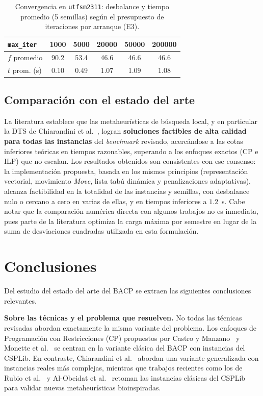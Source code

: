 \documentclass[letter, 10pt]{article}
\begin{document}
\begin{table}[h]
\centering
\begin{tabular}{lccccc}
\hline
\texttt{max\_iter} & 1000 & 5000 & 20000 & 50000 & 200000 \\
\hline
$f$ promedio  & 90.2 & 53.4 & 46.6 & 46.6 & 46.6 \\
$t$ prom. (s) & 0.10 & 0.49 & 1.07 & 1.09 & 1.08 \\
\hline
\end{tabular}
\caption{Convergencia en \texttt{utfsm2311}: desbalance y tiempo promedio (5 semillas) seg\'un el presupuesto de iteraciones por arranque (E3).}
\label{tab:e3}
\end{table}

\subsection{Comparaci\'on con el estado del arte}
La literatura establece que las metaheur\'isticas de b\'usqueda local, y en particular la DTS de Chiarandini et al.~\cite{Chiarandini2012}, logran \textbf{soluciones factibles de alta calidad para todas las instancias} del \emph{benchmark} revisado, acerc\'andose a las cotas inferiores te\'oricas en tiempos razonables, superando a los enfoques exactos (CP e ILP) que no escalan. Los resultados obtenidos son consistentes con ese consenso: la implementaci\'on propuesta, basada en los mismos principios (representaci\'on vectorial, movimiento \textit{Move}, lista tab\'u din\'amica y penalizaciones adaptativas), alcanza factibilidad en la totalidad de las instancias y semillas, con desbalance nulo o cercano a cero en varias de ellas, y en tiempos inferiores a $1.2$~s. Cabe notar que la comparaci\'on num\'erica directa con algunos trabajos no es inmediata, pues parte de la literatura optimiza la carga m\'axima por semestre en lugar de la suma de desviaciones cuadradas utilizada en esta formulaci\'on.

\section{Conclusiones}

Del estudio del estado del arte del BACP se extraen las siguientes 
conclusiones relevantes.

\textbf{Sobre las t\'ecnicas y el problema que resuelven.} No todas 
las t\'ecnicas revisadas abordan exactamente la misma variante del 
problema. Los enfoques de Programaci\'on con Restricciones (CP) 
propuestos por Castro y Manzano~\cite{Castro2001} y Monette et 
al.~\cite{Monette2007} se centran en la variante cl\'asica del BACP 
con instancias del CSPLib. En contraste, Chiarandini et 
al.~\cite{Chiarandini2012} abordan una variante generalizada con 
instancias reales m\'as complejas, mientras que trabajos recientes 
como los de Rubio et al.~\cite{rubio2013} y Al-Obeidat et 
al.~\cite{Firefly2023} retoman las instancias cl\'asicas del CSPLib 
para validar nuevas metaheur\'isticas bioinspiradas.
\end{document}
